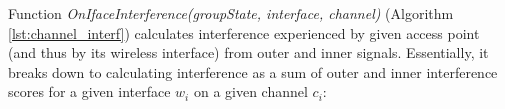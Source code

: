 Function \textit{OnIfaceInterference(groupState, interface, channel)} (Algorithm \ref{lst:channel_interf}) calculates interference experienced by given access point (and thus by its wireless interface) from outer and inner signals.
Essentially, it breaks down to calculating interference as a sum of outer and inner interference scores for a given interface $w_i$ on a given channel $c_i$:
\newenvironment{conditions*}
  {\par\vspace{\abovedisplayskip}\noindent
   \tabularx{\columnwidth}{>{$}l<{$} @{}>{${}}c<{{}$}@{} >{\raggedright\arraybackslash}X}}
  {\endtabularx\par\vspace{\belowdisplayskip}}


\newenvironment{conditions}
  {\par\vspace{\abovedisplayskip}\noindent
   \begin{tabular}{>{$}l<{$} @{} >{${}}c<{{}$} @{} l}}
  {\end{tabular}\par\vspace{\belowdisplayskip}}

